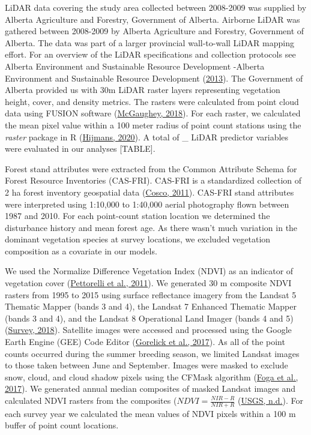 \documentclass[
]{article}
\begin{document}
LiDAR data covering the study area collected between 2008-2009 was supplied by Alberta Agriculture and Forestry, Government of Alberta.
Airborne LiDAR was gathered between 2008-2009 by Alberta Agriculture and Forestry, Government of Alberta. The data was part of a larger provincial wall-to-wall LiDAR mapping effort. For an overview of the LiDAR specifications and collection protocols see Alberta Environment and Sustainable Resource Development -Alberta Environment and Sustainable Resource Development (\protect\hyperlink{ref-AESRD2013}{2013}).
The Government of Alberta provided us with 30m LiDAR raster layers representing vegetation height, cover, and density metrics. The rasters were calculated from point cloud data using FUSION software (\protect\hyperlink{ref-mcgaugheyFUSIONLDVSoftware2018}{McGaughey, 2018}). For each raster, we calculated the mean pixel value within a 100 meter radius of point count stations using the \emph{raster} package in R (\protect\hyperlink{ref-R-raster}{Hijmans, 2020}). A total of \_ LiDAR predictor variables were evaluated in our analyses {[}TABLE{]}.

Forest stand attributes were extracted from the Common Attribute Schema for Forest Resource Inventories (CAS-FRI). CAS-FRI is a standardized collection of 2 ha forest inventory geospatial data (\protect\hyperlink{ref-Cumming2011a}{Cosco, 2011}). CAS-FRI stand attributes were interpreted using 1:10,000 to 1:40,000 aerial photography flown between 1987 and 2010. For each point-count station location we determined the disturbance history and mean forest age. As there wasn't much variation in the dominant vegetation species at survey locations, we excluded vegetation composition as a covariate in our models.

We used the Normalize Difference Vegetation Index (NDVI) as an indicator of vegetation cover (\protect\hyperlink{ref-pettorelliNormalizedDifferenceVegetation2011}{Pettorelli et al., 2011}). We generated 30 m composite NDVI rasters from 1995 to 2015 using surface reflectance imagery from the Landsat 5 Thematic Mapper (bands 3 and 4), the Landsat 7 Enhanced Thematic Mapper (bands 3 and 4), and the Landsat 8 Operational Land Imager (bands 4 and 5)(\protect\hyperlink{ref-geologicalsurveyLandsat47Surface2018}{Survey, 2018}). Satellite images were accessed and processed using the Google Earth Engine (GEE) Code Editor (\protect\hyperlink{ref-gorelickGoogleEarthEngine2017}{Gorelick et al., 2017}). As all of the point counts occurred during the summer breeding season, we limited Landsat images to those taken between June and September. Images were masked to exclude snow, cloud, and cloud shadow pixels using the CFMask algorithm (\protect\hyperlink{ref-fogaCloudDetectionAlgorithm2017}{Foga et al., 2017}). We generated annual median composites of masked Landsat images and calculated NDVI rasters from the composites (\(NDVI=\frac{NIR-R}{NIR+R}\) (\protect\hyperlink{ref-USGS_NDVI}{USGS, n.d.}). For each survey year we calculated the mean values of NDVI pixels within a 100 m buffer of point count locations.
\end{document}
